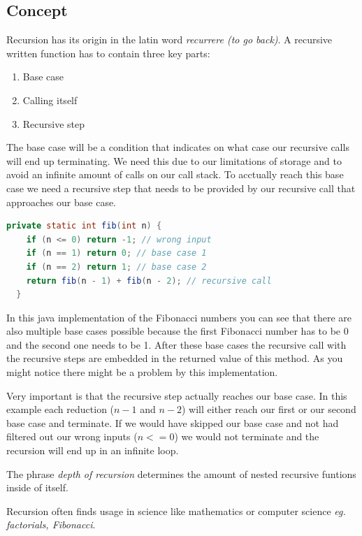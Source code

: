 \documentclass[a4paper, 11pt]{article}
\begin{document}
\subsection{Concept}
Recursion has its origin in the latin word \textit{recurrere (to go back)}. A recursive written function has to contain three key parts:

\begin{enumerate}
  \item Base case
  \item Calling itself
  \item Recursive step
\end{enumerate}

The base case will be a condition that indicates on what case our recursive calls will end up terminating.
We need this due to our limitations of storage and to avoid an infinite amount of calls on our call stack.
To acctually reach this base case we need a recursive step that needs to be provided by our recursive call that approaches our base case.

\begin{lstlisting}[title={Fibonacci numbers}, language=Java]
  private static int fib(int n) {
    if (n <= 0) return -1; // wrong input
    if (n == 1) return 0; // base case 1
    if (n == 2) return 1; // base case 2
    return fib(n - 1) + fib(n - 2); // recursive call
  }
\end{lstlisting}

In this java implementation of the Fibonacci numbers you can see that there are also multiple base cases possible because the first Fibonacci number has to be 0 and the second one needs to be 1.
After these base cases the recursive call with the recursive steps are embedded in the returned value of this method.
As you might notice there might be a problem by this implementation.

Very important is that the recursive step actually reaches our base case. In this example each reduction (\(n-1\) and \(n-2\)) will either reach our first or our second base case and terminate.
If we would have skipped our base case and not had filtered out our wrong inputs (\(n<=0\)) we would not terminate and the recursion will end up in an infinite loop.

The phrase \textit{depth of  recursion} determines the amount of nested recursive funtions inside of itself.

Recursion often finds usage in science like mathematics or computer science \textit{eg. factorials, Fibonacci}.
\end{document}
